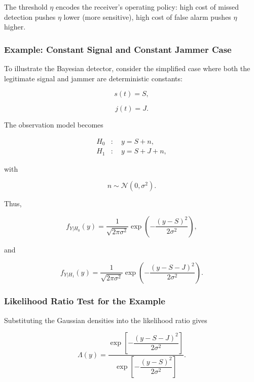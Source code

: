 \documentclass{article}
\begin{document}
The threshold $\eta$ encodes the receiver's operating policy: high cost of missed detection pushes $\eta$ lower (more sensitive), high cost of false alarm pushes $\eta$ higher.

\subsubsection{Example: Constant Signal and Constant Jammer Case}

To illustrate the Bayesian detector, consider the simplified case where both the legitimate signal and jammer are deterministic constants:

\begin{equation}
s(t)=S,
\end{equation}

\begin{equation}
j(t)=J.
\end{equation}

The observation model becomes

\begin{align}
H_0 &: \quad y=S+n,\\
H_1 &: \quad y=S+J+n,
\end{align}

with

\begin{equation}
n \sim \mathcal{N}(0,\sigma^2).
\end{equation}

Thus,

\begin{equation}
f_{Y|H_0}(y)
=
\frac{1}{\sqrt{2\pi\sigma^2}}
\exp\left(
-\frac{(y-S)^2}{2\sigma^2}
\right),
\end{equation}

and

\begin{equation}
f_{Y|H_1}(y)
=
\frac{1}{\sqrt{2\pi\sigma^2}}
\exp\left(
-\frac{(y-S-J)^2}{2\sigma^2}
\right).
\end{equation}

\subsubsection{Likelihood Ratio Test for the Example}

Substituting the Gaussian densities into the likelihood ratio gives

\begin{equation}
\Lambda(y)
=
\frac{
\exp\left[
-\dfrac{(y-S-J)^2}{2\sigma^2}
\right]
}{
\exp\left[
-\dfrac{(y-S)^2}{2\sigma^2}
\right]
}.
\end{equation}
\end{document}

